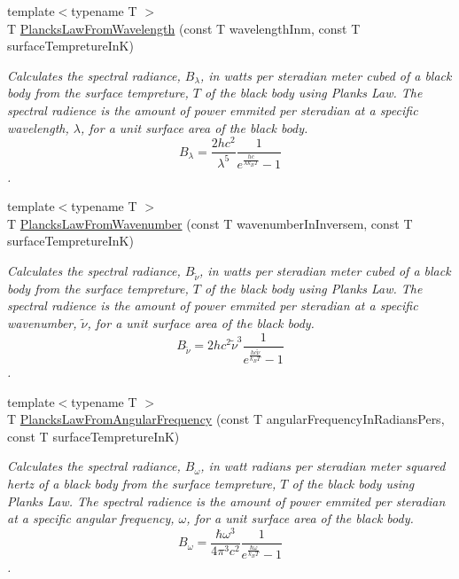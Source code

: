 \begin{DoxyCompactItemize}
{\footnotesize template$<$typename T $>$ }\\T \mbox{\hyperlink{group___e_g_x_phys-_electrodynamics-_black_body-_plancks_law_ga54639bc031ded51ef78aa82b0457a4dd}{Plancks\+Law\+From\+Wavelength}} (const T wavelength\+Inm, const T surface\+Tempreture\+InK)
\begin{DoxyCompactList}\small\item\em Calculates the spectral radiance, $B_{\lambda}$, in watts per steradian meter cubed of a black body from the surface tempreture, $T$ of the black body using Plank\textquotesingle{}s Law. The spectral radience is the amount of power emmited per steradian at a specific wavelength, $\lambda$, for a unit surface area of the black body. \[ B_{\lambda} = \dfrac{2 h c^2}{\lambda^5} \dfrac{1}{e^{\frac{hc}{\lambda k_B T}} - 1} \]. \end{DoxyCompactList}\item 
{\footnotesize template$<$typename T $>$ }\\T \mbox{\hyperlink{group___e_g_x_phys-_electrodynamics-_black_body-_plancks_law_ga6648ae2a0fbff6735c1e1a04c7cac746}{Plancks\+Law\+From\+Wavenumber}} (const T wavenumber\+In\+Inversem, const T surface\+Tempreture\+InK)
\begin{DoxyCompactList}\small\item\em Calculates the spectral radiance, $B_{\tilde {\nu }}$, in watts per steradian meter cubed of a black body from the surface tempreture, $T$ of the black body using Plank\textquotesingle{}s Law. The spectral radience is the amount of power emmited per steradian at a specific wavenumber, $\tilde {\nu }$, for a unit surface area of the black body. \[ B_{\tilde {\nu }} = 2 h c^2 \tilde {\nu }^3 \dfrac{1}{e^{\frac{hc \tilde {\nu }}{k_B T}} - 1} \]. \end{DoxyCompactList}\item 
{\footnotesize template$<$typename T $>$ }\\T \mbox{\hyperlink{group___e_g_x_phys-_electrodynamics-_black_body-_plancks_law_gaac540560c71e30c02b91d22e417b5863}{Plancks\+Law\+From\+Angular\+Frequency}} (const T angular\+Frequency\+In\+Radians\+Pers, const T surface\+Tempreture\+InK)
\begin{DoxyCompactList}\small\item\em Calculates the spectral radiance, $B_{\omega}$, in watt radians per steradian meter squared hertz of a black body from the surface tempreture, $T$ of the black body using Plank\textquotesingle{}s Law. The spectral radience is the amount of power emmited per steradian at a specific angular frequency, $\omega$, for a unit surface area of the black body. \[ B_{\omega} = \dfrac{\hbar \omega^3}{4\pi^3c^2} \dfrac{1}{e^{\frac{\hbar\omega}{k_B T}} - 1} \]. \end{DoxyCompactList}\item 

\end{DoxyCompactItemize}
